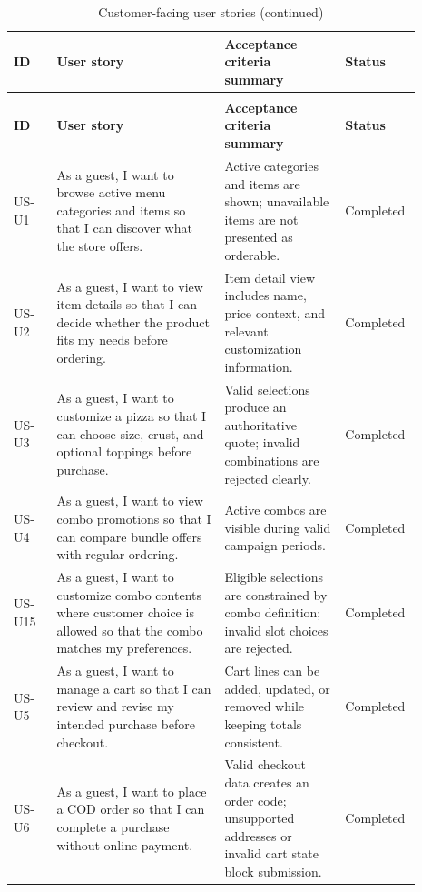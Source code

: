 \begingroup
\footnotesize
\setlength{\LTpre}{0.4em}
\setlength{\LTpost}{0.8em}
\begin{longtable}{L{0.10\linewidth} L{0.39\linewidth} L{0.28\linewidth} L{0.12\linewidth}}
\caption{Customer-facing user stories}\label{tab:customer-user-stories}\\
\toprule
\textbf{ID} & \textbf{User story} & \textbf{Acceptance criteria summary} & \textbf{Status} \\
\midrule
\endfirsthead
\caption[]{Customer-facing user stories (continued)}\\
\toprule
\textbf{ID} & \textbf{User story} & \textbf{Acceptance criteria summary} & \textbf{Status} \\
\midrule
\endhead
\bottomrule
\endfoot
\bottomrule
\endlastfoot
US-U1 & As a guest, I want to browse active menu categories and items so that I can discover what the store offers. & Active categories and items are shown; unavailable items are not presented as orderable. & Completed \\
US-U2 & As a guest, I want to view item details so that I can decide whether the product fits my needs before ordering. & Item detail view includes name, price context, and relevant customization information. & Completed \\
US-U3 & As a guest, I want to customize a pizza so that I can choose size, crust, and optional toppings before purchase. & Valid selections produce an authoritative quote; invalid combinations are rejected clearly. & Completed \\
US-U4 & As a guest, I want to view combo promotions so that I can compare bundle offers with regular ordering. & Active combos are visible during valid campaign periods. & Completed \\
US-U15 & As a guest, I want to customize combo contents where customer choice is allowed so that the combo matches my preferences. & Eligible selections are constrained by combo definition; invalid slot choices are rejected. & Completed \\
US-U5 & As a guest, I want to manage a cart so that I can review and revise my intended purchase before checkout. & Cart lines can be added, updated, or removed while keeping totals consistent. & Completed \\
US-U6 & As a guest, I want to place a COD order so that I can complete a purchase without online payment. & Valid checkout data creates an order code; unsupported addresses or invalid cart state block submission. & Completed \\

\end{longtable}
